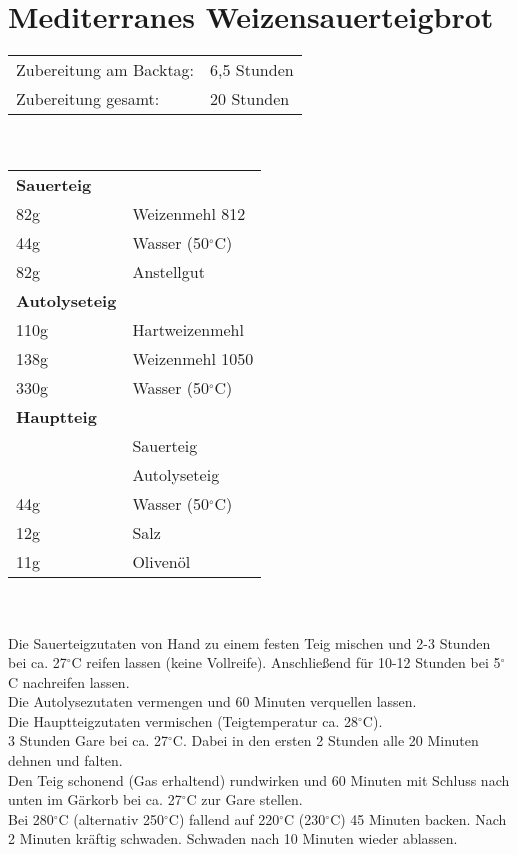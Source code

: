 \section{Mediterranes Weizensauerteigbrot}
\begin{tabular}{ll}
    Zubereitung am Backtag: & 6,5 Stunden \\
    Zubereitung gesamt:     & 20 Stunden
\end{tabular}\\

\paragraph{}
\begin{tabular}{ll}
    \textbf{Sauerteig} \\
    82g  & Weizenmehl 812       \\
    44g  & Wasser (50$^\circ$C) \\
    82g  & Anstellgut           \\
    \textbf{Autolyseteig} \\
    110g & Hartweizenmehl       \\
    138g & Weizenmehl 1050      \\
    330g & Wasser (50$^\circ$C) \\
    \textbf{Hauptteig} \\
    & Sauerteig            \\
    & Autolyseteig         \\
    44g  & Wasser (50$^\circ$C) \\
    12g  & Salz                 \\
    11g  & Olivenöl             \\
\end{tabular}\\

\paragraph{}
Die Sauerteigzutaten von Hand zu einem festen Teig mischen und 2-3 Stunden bei ca. 27$^\circ$C reifen lassen (keine Vollreife). Anschließend für 10-12 Stunden bei 5$^\circ$C nachreifen lassen.\\
Die Autolysezutaten vermengen und 60 Minuten verquellen lassen.\\
Die Hauptteigzutaten vermischen (Teigtemperatur ca. 28$^\circ$C).\\
3 Stunden Gare bei ca. 27$^\circ$C. Dabei in den ersten 2 Stunden alle 20 Minuten dehnen und falten.\\
Den Teig schonend (Gas erhaltend) rundwirken und 60 Minuten mit Schluss nach unten im Gärkorb bei ca. 27$^\circ$C zur Gare stellen.\\
Bei 280$^\circ$C (alternativ 250$^\circ$C) fallend auf 220$^\circ$C (230$^\circ$C) 45 Minuten backen. Nach 2 Minuten kräftig schwaden. Schwaden nach 10 Minuten wieder ablassen.
\newpage


